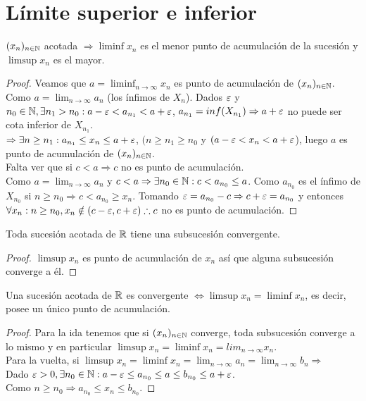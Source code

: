 \section{Límite superior e inferior}

\begin{theorem}
  \((x_n)_{n \in \mathbb{N}}\) acotada \(\Rightarrow \liminf x_n\) es el menor punto de acumulación de la sucesión y \(\limsup x_n\) es el mayor.

  \begin{proof}
    Veamos que \(a = \liminf_{n \to \infty} x_n\) es punto de acumulación de \((x_n)_{n \in \mathbb{N}}\). \\
    Como \(a = \lim_{n \to \infty} a_n\) (los ínfimos de \(X_n\)). Dados \(\varepsilon\) y \(n_0 \in \mathbb{N}, \exists n_1 > n_0 : a-\varepsilon < a_{n_1} < a+\varepsilon\), \(a_{n_1} = inf(X_{n_1}) \Rightarrow a + \varepsilon\) no puede ser cota inferior de \(X_{n_1}\). \\
    \(\Rightarrow \exists n \geq n_1 : a_{n_1} \leq x_n \leq a+\varepsilon\), \((n \geq n_1 \geq n_0\) y \((a - \varepsilon < x_n < a + \varepsilon\)), luego \(a\) es punto de acumulación de \((x_n)_{n \in \mathbb{N}}\). \\
    Falta ver que si \(c < a \Rightarrow c\) no es punto de acumulación. \\
    Como \(a = \lim_{n \to \infty} a_n\) y \(c < a \Rightarrow \exists n_0 \in \mathbb{N} : c < a_{n_0} \leq a\). Como \(a_{n_0}\) es el ínfimo de \(X_{n_0}\) si \(n \geq n_0 \Rightarrow c < a_{n_0} \geq x_n\). Tomando \(\varepsilon = a_{n_0} - c \Rightarrow c+\varepsilon = a_{n_0}\) y entonces \(\forall x_n: n \geq n_0, x_n \notin (c - \varepsilon, c + \varepsilon) \therefore c\) no es punto de acumulación.
  \end{proof}
\end{theorem}

\begin{theorem}
  Toda sucesión acotada de \(\mathbb{R}\) tiene una subsucesión convergente.
  \begin{proof}
    \(\limsup x_n\) es punto de acumulación de \(x_n\) así que alguna subsucesión converge a él.
  \end{proof}
\end{theorem}

\begin{corollary}
  Una sucesión acotada de \(\mathbb{R}\) es convergente \(\iff \limsup x_n = \liminf x_n\), es decir, posee un único punto de acumulación.
  \begin{proof}
    Para la ida tenemos que si \((x_n)_{n \in \mathbb{N}}\) converge, toda subsucesión converge a lo mismo y en particular \(\limsup x_n = \liminf x_n = lim_{n \to \infty} x_n\). \\
    Para la vuelta, si \(\limsup x_n = \liminf x_n = \lim_{n \to \infty} a_n = \lim_{n \to \infty} b_n \Rightarrow\) \\
    Dado \(\varepsilon > 0, \exists n_0 \in \mathbb{N} : a - \varepsilon \leq a_{n_0} \leq a \leq b_{n_0} \leq a + \varepsilon\). \\
    Como \(n \geq n_0 \Rightarrow a_{n_0} \leq x_n \leq b_{n_0}\).
  \end{proof}
\end{corollary}

